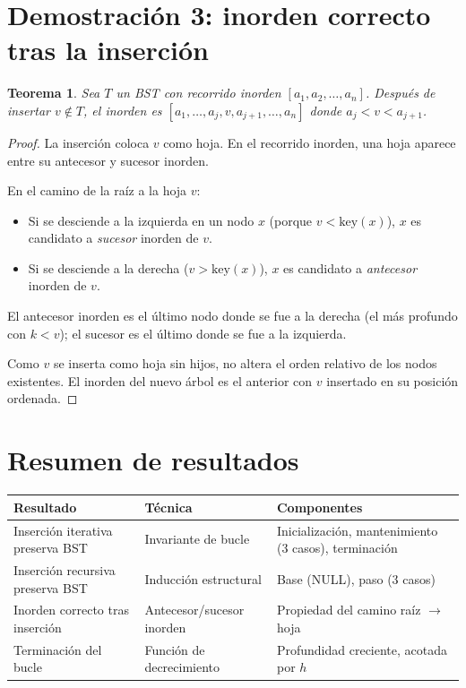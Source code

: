 \documentclass[11pt, letterpaper]{article}
\theoremstyle{definition}
\theoremstyle{plain}
\newtheorem{theorem}{Teorema}[section]
\theoremstyle{remark}
\begin{document}
\section{Demostración 3: inorden correcto tras la inserción}

\begin{theorem}\label{thm:inorder}
Sea $T$ un BST con recorrido inorden $[a_1, a_2, \ldots, a_n]$.
Después de insertar $v \notin T$, el inorden es
$[a_1, \ldots, a_j, v, a_{j+1}, \ldots, a_n]$ donde $a_j < v < a_{j+1}$.
\end{theorem}

\begin{proof}
La inserción coloca $v$ como hoja. En el recorrido inorden, una hoja
aparece entre su antecesor y sucesor inorden.

En el camino de la raíz a la hoja $v$:
\begin{itemize}
  \item Si se desciende a la izquierda en un nodo $x$ (porque $v < \text{key}(x)$),
    $x$ es candidato a \emph{sucesor} inorden de $v$.
  \item Si se desciende a la derecha ($v > \text{key}(x)$), $x$ es
    candidato a \emph{antecesor} inorden de $v$.
\end{itemize}

El antecesor inorden es el último nodo donde se fue a la derecha
(el más profundo con $k < v$); el sucesor es el último donde se fue a
la izquierda.

Como $v$ se inserta como hoja sin hijos, no altera el orden relativo
de los nodos existentes. El inorden del nuevo árbol es el anterior con
$v$ insertado en su posición ordenada.
\end{proof}

\section{Resumen de resultados}

\begin{table}[h]
\centering
\begin{tabular}{llp{6cm}}
\toprule
\textbf{Resultado} & \textbf{Técnica} & \textbf{Componentes} \\
\midrule
Inserción iterativa preserva BST
  & Invariante de bucle
  & Inicialización, mantenimiento (3 casos), terminación \\
Inserción recursiva preserva BST
  & Inducción estructural
  & Base (NULL), paso (3 casos) \\
Inorden correcto tras inserción
  & Antecesor/sucesor inorden
  & Propiedad del camino raíz $\to$ hoja \\
Terminación del bucle
  & Función de decrecimiento
  & Profundidad creciente, acotada por $h$ \\
\bottomrule
\end{tabular}
\end{table}
\end{document}
